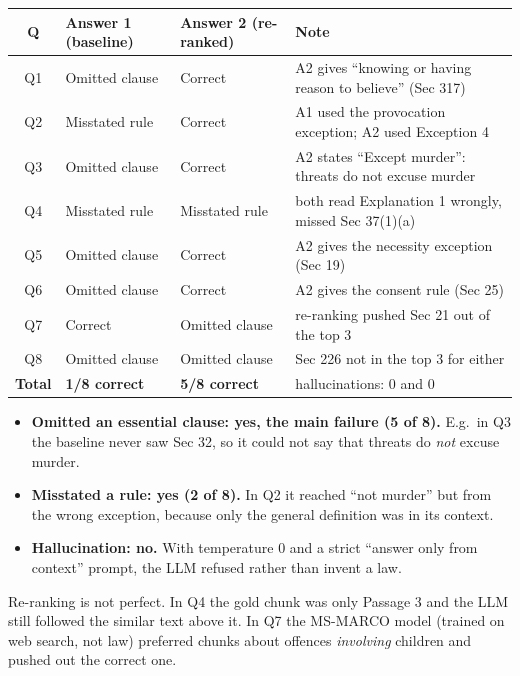 \documentclass[10pt,a4paper]{article}
\newcommand{\good}[1]{\textcolor{green!45!black}{#1}}
\newcommand{\bad}[1]{\textcolor{red!70!black}{#1}}
\begin{document}
\begin{table}[H]\centering\small
{}
\begin{tabular}{@{}clll@{}}
\toprule
\textbf{Q} & \textbf{Answer 1 (baseline)} & \textbf{Answer 2 (re-ranked)} & \textbf{Note}\\
\midrule
Q1 & \bad{Omitted clause} & \good{Correct} & A2 gives ``knowing or having reason to believe'' (Sec 317)\\
Q2 & \bad{Misstated rule} & \good{Correct} & A1 used the provocation exception; A2 used Exception 4\\
Q3 & \bad{Omitted clause} & \good{Correct} & A2 states ``Except murder'': threats do not excuse murder\\
Q4 & \bad{Misstated rule} & \bad{Misstated rule} & both read Explanation 1 wrongly, missed Sec 37(1)(a)\\
Q5 & \bad{Omitted clause} & \good{Correct} & A2 gives the necessity exception (Sec 19)\\
Q6 & \bad{Omitted clause} & \good{Correct} & A2 gives the consent rule (Sec 25)\\
Q7 & \good{Correct} & \bad{Omitted clause} & re-ranking pushed Sec 21 out of the top 3\\
Q8 & \bad{Omitted clause} & \bad{Omitted clause} & Sec 226 not in the top 3 for either\\
\midrule
\rowcolor{white}\textbf{Total} & \textbf{1/8 correct} & \textbf{5/8 correct} & hallucinations: 0 and 0\\
\bottomrule
\end{tabular}
\end{table}

\begin{itemize}\setlength\itemsep{1pt}
\item \textbf{Omitted an essential clause: yes, the main failure (5 of 8).} E.g.\ in Q3 the baseline never saw Sec 32, so it could not say that threats do \emph{not} excuse murder.
\item \textbf{Misstated a rule: yes (2 of 8).} In Q2 it reached ``not murder'' but from the wrong exception, because only the general definition was in its context.
\item \textbf{Hallucination: no.} With temperature 0 and a strict ``answer only from context'' prompt, the LLM refused rather than invent a law.
\end{itemize}
Re-ranking is not perfect. In Q4 the gold chunk was only Passage 3 and the LLM still followed the similar text above it.
In Q7 the MS-MARCO model (trained on web search, not law) preferred chunks about offences \emph{involving} children and pushed out the correct one.
\end{document}
